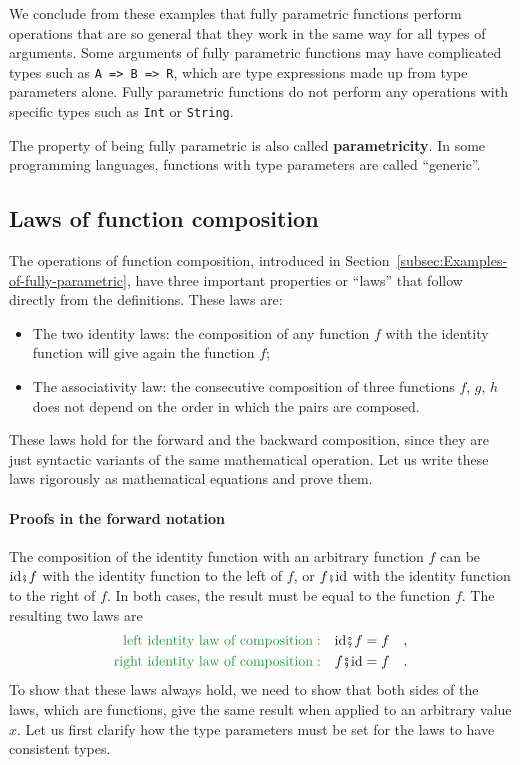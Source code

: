 We conclude from these examples that fully parametric functions perform
operations that are so general that they work in the same way for
all types of arguments. Some arguments of fully parametric functions
may have complicated types such as \lstinline!A => B => R!, which
are type expressions made up from type parameters alone. Fully parametric
functions do not perform any operations with specific types such as
\lstinline!Int! or \lstinline!String!.

The property of being fully parametric is also called \textbf{parametricity}.
In some programming languages, functions with type parameters are
called ``generic''.

\subsection{Laws of function composition\label{subsec:Laws-of-function-composition}}

The operations of function composition, introduced in Section~\ref{subsec:Examples-of-fully-parametric},
have three important properties or ``laws'' that follow directly
from the definitions. These laws are:
\begin{itemize}
\item The two identity laws: the composition of any function $f$ with the
identity function will give again the function $f$;
\item The associativity law: the consecutive composition of three functions
$f$, $g$, $h$ does not depend on the order in which the pairs are
composed.
\end{itemize}
These laws hold for the forward and the backward composition, since
they are just syntactic variants of the same mathematical operation.
Let us write these laws rigorously as mathematical equations and prove
them.

\paragraph{Proofs in the forward notation}

The composition of the identity function with an arbitrary function
$f$ can be $\text{id}\bef f$ with the identity function to the left
of $f$, or $f\bef\text{id}$ with the identity function to the right
of $f$. In both cases, the result must be equal to the function $f$.
The resulting two laws are
\begin{align*}
{\color{greenunder}\text{left identity law of composition}:}\quad & \text{id}\bef f=f\quad,\\
{\color{greenunder}\text{right identity law of composition}:}\quad & f\bef\text{id}=f\quad.
\end{align*}
To show that these laws always hold, we need to show that both sides
of the laws, which are functions, give the same result when applied
to an arbitrary value $x$. Let us first clarify how the type parameters
must be set for the laws to have consistent types.

